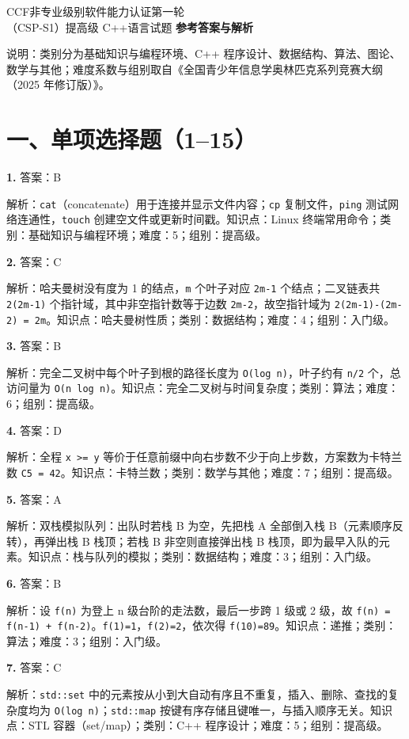 \documentclass[a4paper]{ctexart}
\newcommand{\ans}[2]{\noindent\textbf{#1} \quad 答案：#2\par}
\newcommand{\expn}[1]{\hspace*{1.5em} 解析：#1\par}
\begin{document}
\begin{center}
{\dengxian
    {\fontsize{15.95}{1} CCF非专业级别软件能力认证第一轮}\\[1em]
    {\fontsize{14.05}{1}\selectfont （CSP-S1）提高级 C++语言试题 \textbf{参考答案与解析}}
}
\end{center}

\noindent 说明：类别分为基础知识与编程环境、C++ 程序设计、数据结构、算法、图论、数学与其他；难度系数与组别取自《全国青少年信息学奥林匹克系列竞赛大纲（2025 年修订版）》。

\section*{一、单项选择题（1--15）}

\ans{1.}{B}
\expn{\texttt{cat}（concatenate）用于连接并显示文件内容；\texttt{cp} 复制文件，\texttt{ping} 测试网络连通性，\texttt{touch} 创建空文件或更新时间戳。\quad 知识点：Linux 终端常用命令；类别：基础知识与编程环境；难度：5；组别：提高级。}

\ans{2.}{C}
\expn{哈夫曼树没有度为 1 的结点，\texttt{m} 个叶子对应 \texttt{2m-1} 个结点；二叉链表共 \texttt{2(2m-1)} 个指针域，其中非空指针数等于边数 \texttt{2m-2}，故空指针域为 \texttt{2(2m-1)-(2m-2) = 2m}。\quad 知识点：哈夫曼树性质；类别：数据结构；难度：4；组别：入门级。}

\ans{3.}{B}
\expn{完全二叉树中每个叶子到根的路径长度为 \texttt{O(log n)}，叶子约有 \texttt{n/2} 个，总访问量为 \texttt{O(n log n)}。\quad 知识点：完全二叉树与时间复杂度；类别：算法；难度：6；组别：提高级。}

\ans{4.}{D}
\expn{全程 \texttt{x >= y} 等价于任意前缀中向右步数不少于向上步数，方案数为卡特兰数 \texttt{C5 = 42}。\quad 知识点：卡特兰数；类别：数学与其他；难度：7；组别：提高级。}

\ans{5.}{A}
\expn{双栈模拟队列：出队时若栈 B 为空，先把栈 A 全部倒入栈 B（元素顺序反转），再弹出栈 B 栈顶；若栈 B 非空则直接弹出栈 B 栈顶，即为最早入队的元素。\quad 知识点：栈与队列的模拟；类别：数据结构；难度：3；组别：入门级。}

\ans{6.}{B}
\expn{设 \texttt{f(n)} 为登上 n 级台阶的走法数，最后一步跨 1 级或 2 级，故 \texttt{f(n) = f(n-1) + f(n-2)}。\texttt{f(1)=1}，\texttt{f(2)=2}，依次得 \texttt{f(10)=89}。\quad 知识点：递推；类别：算法；难度：3；组别：入门级。}

\ans{7.}{C}
\expn{\texttt{std::set} 中的元素按从小到大自动有序且不重复，插入、删除、查找的复杂度均为 \texttt{O(log n)}；\texttt{std::map} 按键有序存储且键唯一，与插入顺序无关。\quad 知识点：STL 容器（set/map）；类别：C++ 程序设计；难度：5；组别：提高级。}
\end{document}
